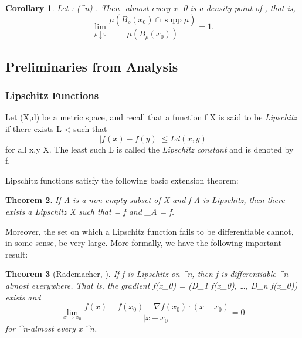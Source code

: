 \documentclass[a4paper, 11pt]{article}
\theoremstyle{plain}
\newtheorem{theorem}{Theorem}[section]
\newtheorem{corollary}[theorem]{Corollary}
\theoremstyle{definition}
\theoremstyle{remark}
\DeclareMathOperator{\lip}{Lip}
\numberwithin{equation}{subsection}
\def\({}
\def\){}
\begin{document}
\begin{corollary}
Let \(\mu : (^{n}) \rightarrow [0, +\infty]\). Then \(\mu\)-almost every \(x_{0} \in {} \mu\) is a \emph{density point} of \(\mu\), that is,
\begin{equation}
\lim_{\rho \downarrow 0} \frac{\mu(B_{\rho}(x_{0}) \cap \operatorname{supp} \mu)}{\mu(B_{\rho}(x_{0}))} = 1.
\end{equation}
\end{corollary}

\subsection{Preliminaries from Analysis}

\subsubsection{Lipschitz Functions}

Let \((X,d)\) be a metric space, and recall that a function \(f \vcentcolon X \rightarrow {}\) is said to be  \emph{Lipschitz} if there exists \(L < \infty\) such that
\begin{equation}
\vert f(x) - f(y) \vert \leqslant L d(x,y)
\end{equation}
for all \(x,y \in X\). The least such \(L\) is called the \emph{Lipschitz constant} and is denoted by \(\lip f\).

Lipschitz functions satisfy the following basic extension theorem:

\begin{theorem}
\label{Lipschitz_Extension_Theorem}
If \(A\) is a non-empty subset of \(X\) and \(f \vcentcolon A \rightarrow {}\) is Lipschitz, then there exists a Lipschitz \( \vcentcolon X \rightarrow {}\) such that \(\lip {} = \lip f\) and \(\vert_A = f\).
\end{theorem}

Moreover, the set on which a Lipschitz function fails to be differentiable cannot, in some sense, be very large. More formally, we have the following important result:

\begin{theorem}[{Rademacher, \cite[Section 2.1]{Sim18}}]
If \(f\) is Lipschitz on \(^n\), then \(f\) is differentiable \(^n\)-almost everywhere. That is, the gradient \(\nabla f(x_0) = (D_1 f(x_0), \ldots, D_n f(x_0))\) exists and
\begin{equation}
\lim_{x \rightarrow x_0} \frac{f(x) - f(x_0) - \nabla f(x_0) \cdot (x-x_0)}{|x-x_0|} = 0
\end{equation}
for \(^n\)-almost every \(x \in {}^n\).
\end{theorem}
\end{document}
